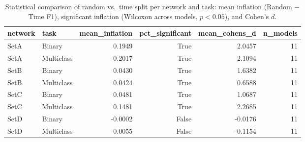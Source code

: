 \begin{table}
\caption{Statistical comparison of random vs.\ time split per network and task: mean inflation (Random $-$ Time F1), significant inflation (Wilcoxon across models, $p<0.05$), and Cohen's $d$.}
\label{tab:q2_stats}
\begin{tabular}{llrrrr}
\toprule
network & task & mean_inflation & pct_significant & mean_cohens_d & n_models \\
\midrule
SetA & Binary & 0.1949 & True & 2.0457 & 11 \\
SetA & Multiclass & 0.2017 & True & 2.1094 & 11 \\
SetB & Binary & 0.0430 & True & 1.6382 & 11 \\
SetB & Multiclass & 0.0424 & True & 0.6588 & 11 \\
SetC & Binary & 0.0481 & True & 1.0687 & 11 \\
SetC & Multiclass & 0.1481 & True & 2.2685 & 11 \\
SetD & Binary & -0.0002 & False & -0.0176 & 11 \\
SetD & Multiclass & -0.0055 & False & -0.1154 & 11 \\
\bottomrule
\end{tabular}
\end{table}
